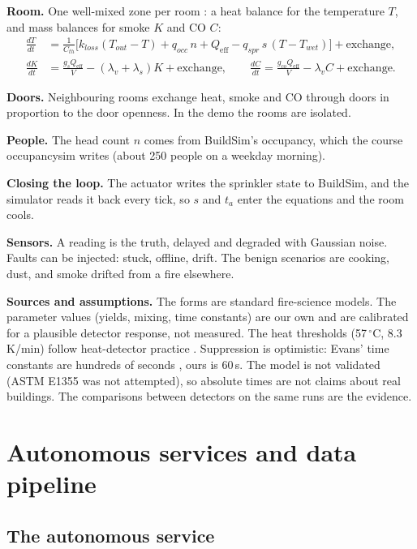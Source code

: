 \documentclass[11pt]{article}
\begin{document}
\textbf{Room.} One well-mixed zone per room \cite{karlsson}: a heat balance for the temperature $T$, and mass balances for smoke $K$ and CO $C$:
\begin{align}
\frac{dT}{dt}&=\frac{1}{C_{th}}\Big[k_{loss}(T_{out}-T)+q_{occ}\,n+Q_{\mathrm{eff}}-q_{spr}\,s\,(T-T_{wet})\Big]+\text{exchange},\\
\frac{dK}{dt}&=\frac{g_s Q_{\mathrm{eff}}}{V}-(\lambda_v+\lambda_s)K+\text{exchange},\qquad
\frac{dC}{dt}=\frac{g_{co} Q_{\mathrm{eff}}}{V}-\lambda_v C+\text{exchange}.
\end{align}

\textbf{Doors.} Neighbouring rooms exchange heat, smoke and CO through doors in proportion to the door openness. In the demo the rooms are isolated.

\textbf{People.} The head count $n$ comes from BuildSim's occupancy, which the course occupancysim writes (about 250 people on a weekday morning).

\textbf{Closing the loop.} The actuator writes the sprinkler state to BuildSim, and the simulator reads it back every tick, so $s$ and $t_a$ enter the equations and the room cools.

\textbf{Sensors.} A reading is the truth, delayed and degraded with Gaussian noise. Faults can be injected: stuck, offline, drift. The benign scenarios are cooking, dust, and smoke drifted from a fire elsewhere.

\textbf{Sources and assumptions.}\label{sec:sources} The forms are standard fire-science models. The parameter values (yields, mixing, time constants) are our own and are calibrated for a plausible detector response, not measured. The heat thresholds (57\,$^\circ$C, 8.3\,K/min) follow heat-detector practice \cite{heatdet}. Suppression is optimistic: Evans' time constants are hundreds of seconds \cite{evans}, ours is 60\,s. The model is not validated (ASTM E1355 was not attempted), so absolute times are not claims about real buildings. The comparisons between detectors on the same runs are the evidence.

\section{Autonomous services and data pipeline}\label{sec:services}

\subsection{The autonomous service}
\end{document}
